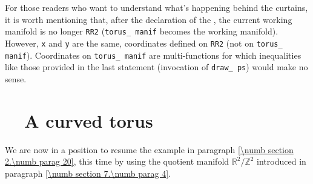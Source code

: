 For those readers who want to understand what's happening behind the curtains,
it is worth mentioning that, after the declaration of the {\small\tt{}}
{\small\tt{}}, the current working manifold is no longer {\small\tt RR2}
({\small\tt torus\_\,manif} becomes the working manifold).
However, {\small\tt x} and {\small\tt y} are the same, coordinates defined on {\small\tt RR2}
(not on {\small\tt torus\_\,manif}).
Coordinates on {\small\tt torus\_\,manif} are multi-functions for which inequalities like
those provided in the last statement (invocation of {\small\tt draw\_\,ps}) would make no sense.


\section{~~A curved torus}\label{\numb section 7.\numb parag 5}

We are now in a position to resume the example in paragraph \ref{\numb section 2.\numb parag 20},
this time by using the quotient manifold $ \mathbb{R}^2/{\mathbb Z}^2 $ introduced in paragraph
\ref{\numb section 7.\numb parag 4}.

